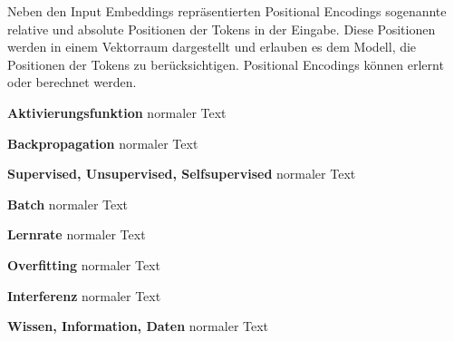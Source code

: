\begin{definition}\label{def:positional-encodings}
    Neben den Input Embeddings repräsentierten Positional Encodings sogenannte relative und absolute Positionen der Tokens in der Eingabe. Diese Positionen werden in einem Vektorraum dargestellt und erlauben es dem Modell, die Positionen der Tokens zu berücksichtigen. Positional Encodings können erlernt oder berechnet werden.
\end{definition}



\begin{definition}

\end{definition}

\begin{definition}[Hyperparameter]
    
\end{definition}

\begin{definition}
    \textbf{Aktivierungsfunktion} normaler Text
\end{definition}

\begin{definition}
    \textbf{Backpropagation} normaler Text
\end{definition}

\begin{definition}
    \textbf{Supervised, Unsupervised, Selfsupervised} normaler Text
\end{definition}

\begin{definition}
    \textbf{Batch} normaler Text
\end{definition}

\begin{definition}
    \textbf{Lernrate} normaler Text
\end{definition}

\begin{definition}
    \textbf{Overfitting} normaler Text
\end{definition}

\begin{definition}
    \textbf{Interferenz} normaler Text
\end{definition}


\begin{definition}
    \textbf{Wissen, Information, Daten} normaler Text
\end{definition}

